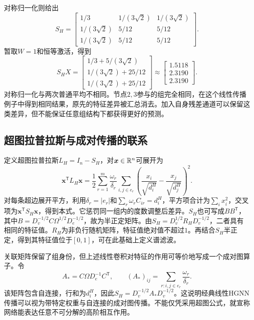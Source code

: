 对称归一化则给出
\begin{equation}
 S_H=\begin{bmatrix}
 1/3&1/(3\sqrt2)&1/(3\sqrt2)\\
 1/(3\sqrt2)&5/12&5/12\\
 1/(3\sqrt2)&5/12&5/12
 \end{bmatrix}.
\end{equation}
暂取$W=1$和恒等激活，得到
\begin{equation}
 S_HX=\begin{bmatrix}1/3+5/(3\sqrt2)\\1/(3\sqrt2)+25/12\\1/(3\sqrt2)+25/12\end{bmatrix}
 \approx\begin{bmatrix}1.5118\\2.3190\\2.3190\end{bmatrix}.
 \label{eq:graph-hyper-example}
\end{equation}
对称归一化与两次普通平均不相同。节点$2,3$参与的组完全相同，在这个线性传播例子中得到相同结果，原先的特征差异被汇总消去。加入自身残差通道可以保留这类差异，但不能保证任意组结构下都获得更好的预测。

\subsection{超图拉普拉斯与成对传播的联系}
定义超图拉普拉斯$L_H=I_n-S_H$，对$\bm x\in\mathbb{R}^n$可展开为
\begin{equation}
 \bm x^{\mathsf T}L_H\bm x=
 \frac12\sum_{r=1}^m\frac{\omega_r}{\delta_r}
 \sum_{i,j\in e_r}
 \left(\frac{x_i}{\sqrt{d_i^H}}-\frac{x_j}{\sqrt{d_j^H}}\right)^2.
 \label{eq:graph-hyper-smoothness}
\end{equation}
对每条超边展开平方，利用$\delta_r=|e_r|$和$\sum_r\omega_rC_{ir}=d_i^H$，平方项合计为$\sum_i x_i^2$，交叉项为$\bm x^{\mathsf T}S_H\bm x$，得到本式。它惩罚同一组内的度数调整后差异。$S_H$也可写成$BB^{\mathsf T}$，其中$B=D_v^{-1/2}C\Omega^{1/2}D_e^{-1/2}$，故为半正定矩阵。由$S_H=D_v^{1/2}R_HD_v^{-1/2}$，二者具有相同的特征值。$R_H$为非负行随机矩阵，特征值绝对值不超过$1$。再结合$S_H$半正定，得到其特征值位于$[0,1]$，可在此基础上定义谱滤波。

关联矩阵保留了组身份，但上述线性卷积对特征的作用可等价地写成一个成对图算子。令
\begin{equation}
 A_* =C\Omega D_e^{-1}C^{\mathsf T},\qquad
 (A_*)_{ij}=\sum_{r:i,j\in e_r}\frac{\omega_r}{\delta_r}.
 \label{eq:graph-hyper-clique}
\end{equation}
该矩阵包含自连接，行和为$d_i^H$，因此$S_H=D_v^{-1/2}A_*D_v^{-1/2}$。这说明经典线性HGNN传播可以视为带特定权重与自连接的成对图传播。不能仅凭采用超图公式，就宣称网络能表达任意不可分解的高阶相互作用。

